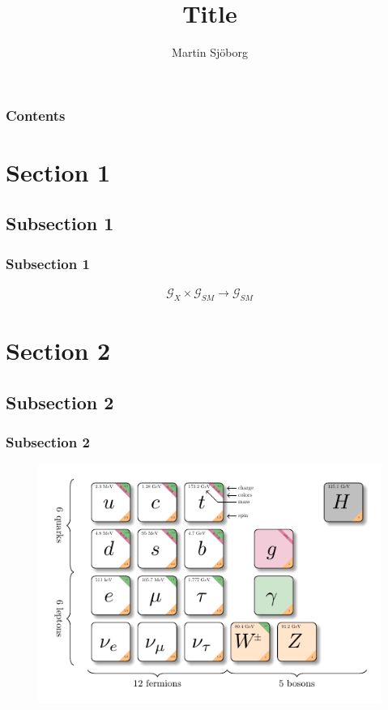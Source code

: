 \documentclass[hyperref={pdfpagelabels=false}]{beamer}
\title{Title}
\author{Martin Sjöborg}
\begin{document}
\begin{frame}
\titlepage
\end{frame} 


\begin{frame}
\frametitle{Contents}
\tableofcontents[pausesubsections]
\end{frame} 


\section{Section 1} 
\subsection{Subsection 1}
\begin{frame}
\frametitle{Subsection 1} 
\begin{align}
    \mathcal{G}_X \times \mathcal{G}_{SM} \to \mathcal{G}_{SM} \nonumber 
\end{align}
\end{frame}

\section{Section 2} 
\subsection{Subsection 2}
\begin{frame}
\frametitle{Subsection 2} 
\begin{figure}
    \centering
    \includegraphics[scale = 1]{SM_1.pdf}
\end{figure}
\end{frame}
\end{document}
